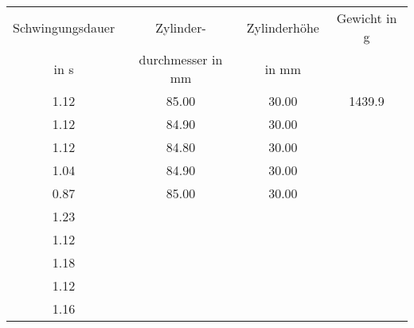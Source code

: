 \begin{center}
	\begin{tabular}{ c || c | c | c }
	\hline
		Schwingungsdauer & Zylinder- & Zylinderhöhe & Gewicht in g \\
		in s & durchmesser in mm & in mm & \\
	\hline
		1.12 & 85.00 & 30.00 & 1439.9 \\
		1.12 & 84.90 & 30.00 & \\
		1.12 & 84.80 & 30.00 & \\
		1.04 & 84.90 & 30.00 & \\
		0.87 & 85.00 & 30.00 & \\
		1.23 & & & \\
		1.12 & & & \\
		1.18 & & & \\
		1.12 & & & \\
		1.16 & & & \\
	\end{tabular}
\end{center}